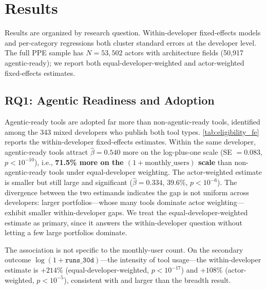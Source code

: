 \section{Results}
\label{sec:results}

Results are organized by research question. Within-developer fixed-effects
models and per-category regressions both cluster standard errors at the
developer level. The full PPE sample has $N = 53{,}502$ actors with architecture
fields (50{,}917 agentic-ready); we report both equal-developer-weighted and
actor-weighted fixed-effects estimates.

\subsection{RQ1: Agentic Readiness and Adoption}
\label{sec:results:rq1}

Agentic-ready tools are adopted far more than non-agentic-ready tools,
identified among the 343 mixed developers who publish both tool types.
\autoref{tab:eligibility_fe} reports the within-developer fixed-effects
estimates. Within the same developer, agentic-ready tools attract
$\hat\beta = 0.540$ more on the log-plus-one scale (SE $= 0.083$,
$p < 10^{-10}$), i.e., \textbf{71.5\% more on the $(1 + \text{monthly\_users})$
scale} than non-agentic-ready tools under equal-developer weighting. The
actor-weighted estimate is smaller but still large and significant
($\hat\beta = 0.334$, 39.6\%, $p < 10^{-6}$). The divergence between the two estimands indicates the gap is
not uniform across developers: larger portfolios---whose many tools dominate
actor weighting---exhibit smaller within-developer gaps. We treat the
equal-developer-weighted estimate as primary, since it answers the
within-developer question without letting a few large portfolios dominate.



The association is not specific to the monthly-user count. On the secondary
outcome $\log(1 + \texttt{runs\_30d})$---the intensity of tool usage---the
within-developer estimate is $+214\%$ (equal-developer-weighted,
$p < 10^{-17}$) and $+108\%$ (actor-weighted, $p < 10^{-5}$), consistent with
and larger than the breadth result.


